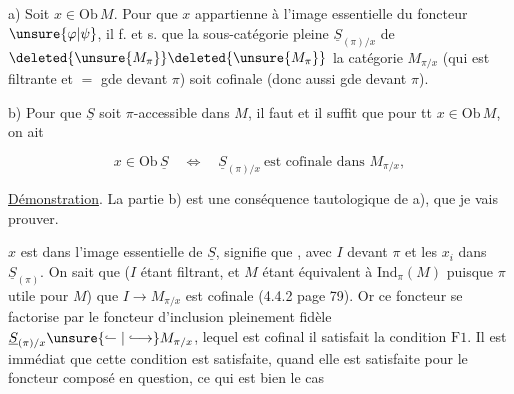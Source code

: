 

a) Soit $x\in\mathrm{Ob}\,M$. Pour que $x$ appartienne à l'image essentielle du foncteur $\unsure{\varphi|\psi}$, il f. et s. que la sous-catégorie pleine $\underline S_{(\pi)/x}$ de $\deleted{\unsure{M_\pi}}\deleted{\unsure{M_\pi}}$ la catégorie $M_{\pi/x}$ (qui est filtrante et $=$ gde devant $\pi$) soit cofinale (donc aussi gde devant $\pi$).

b) Pour que $\underline S$ soit $\pi$-accessible dans $M$, il faut et il suffit que pour tt $x\in\mathrm{Ob}\,M$, on ait

\[x\in\mathrm{Ob}\,\underline S\quad\Longleftrightarrow\quad\underline S_{(\pi)/x}\ \text{est cofinale dans }M_{\pi/x},\]


\uline{Démonstration}. La partie b) est une conséquence tautologique de a), que je vais prouver.

 $x$  est dans l'image essentielle de $\underline S$, signifie que , avec $I$  devant $\pi$ et les $x_i$ dans $\underline S_{(\pi)}$. On sait que    ($I$ étant filtrant, et $M$ étant équivalent à $\mathrm{Ind}_\pi(M)$ puisque $\pi$ utile pour $M$) que $I\longrightarrow M_{\pi/x}$ est cofinale (4.4.2 page 79). Or ce foncteur se factorise par le foncteur d'inclusion pleinement fidèle $\underline S_{(\pi)/x}\unsure{\lhook\joinrel\relbar|\lhook\joinrel\longrightarrow} M_{\pi/x}$, lequel est cofinal  il satisfait la condition $\mathrm{F}1$. Il est immédiat que cette condition est satisfaite, quand elle est satisfaite pour le foncteur composé en question, ce qui est bien le cas

